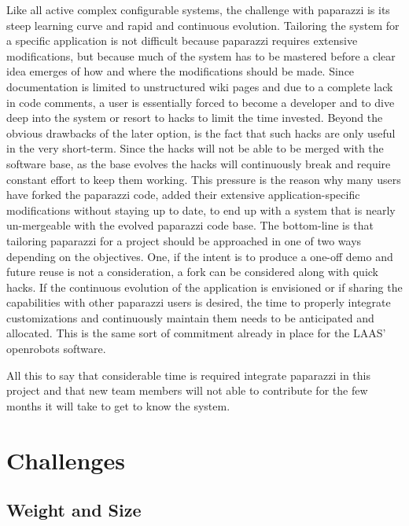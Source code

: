 \documentclass[a4paper,11pt]{report}
\begin{document}
Like all active complex configurable systems, the challenge with paparazzi is its steep learning curve and rapid and continuous evolution. Tailoring the system for a specific application is not difficult because paparazzi requires extensive modifications, but because much of the system has to be mastered before a clear idea emerges of how and where the modifications should be made. Since documentation is limited to unstructured wiki pages and due to a complete lack in code comments, a user is essentially forced to become a developer and to dive deep into the system or resort to hacks to limit the time invested. Beyond the obvious drawbacks of the later option, is the fact that such hacks are only useful in the very short-term. Since the hacks will not be able to be merged with the software base, as the base evolves the hacks will continuously break and require constant effort to keep them working. This pressure is the reason why many users have forked the paparazzi code, added their extensive application-specific modifications without staying up to date, to end up with a system that is nearly un-mergeable with the evolved paparazzi code base. The bottom-line is that tailoring paparazzi for a project should be approached in one of two ways depending on the objectives. One, if the intent is to produce a one-off demo and future reuse is not a consideration, a fork can be considered along with quick hacks. If the continuous evolution of the application is envisioned or if sharing the capabilities with other paparazzi users is desired, the time to properly integrate customizations and continuously maintain them needs to be anticipated and allocated. This is the same sort of commitment already in place for the LAAS' openrobots software.

All this to say that considerable time is required integrate paparazzi in this project and that new team members will not able to contribute for the few months it will take to get to know the system.

\section{Challenges}

\subsection{Weight and Size}
\end{document}
